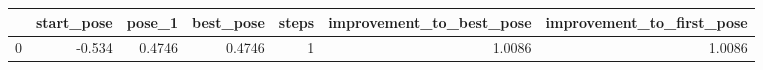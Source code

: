 \begin{tabular}{lrrrrrr}
\toprule
{} &  start\_pose &  pose\_1 &  best\_pose &  steps &  improvement\_to\_best\_pose &  improvement\_to\_first\_pose \\
\midrule
0 &      -0.534 &  0.4746 &     0.4746 &      1 &                    1.0086 &                     1.0086 \\
\bottomrule
\end{tabular}
